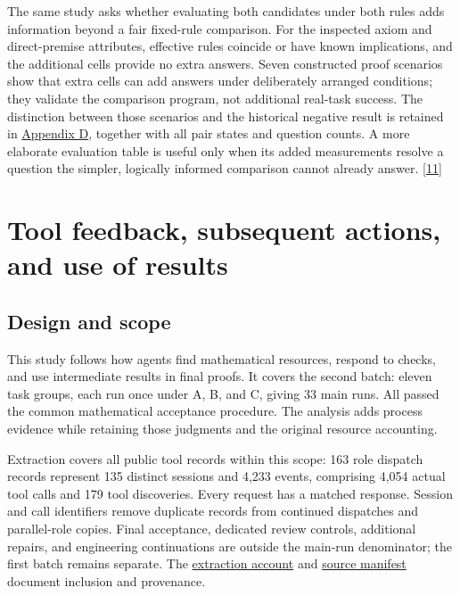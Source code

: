 The same study asks whether evaluating both candidates under both rules adds information beyond a fair fixed-rule comparison. For the inspected axiom and direct-premise attributes, effective rules coincide or have known implications, and the additional cells provide no extra answers. Seven constructed proof scenarios show that extra cells can add answers under deliberately arranged conditions; they validate the comparison program, not additional real-task success. The distinction between those scenarios and the historical negative result is retained in \href{en-appendix.pdf\#appendix-d}{Appendix D}, together with all pair states and question counts. A more elaborate evaluation table is useful only when its added measurements resolve a question the simpler, logically informed comparison cannot already answer. \href{en.pdf\#ref-11}{\mbox{[11]}}

\section[Tool feedback, subsequent actions, and use of results]{\texorpdfstring{\protect\hypertarget{appendix-s}{}Tool feedback, subsequent actions, and use of results}{Tool feedback, subsequent actions, and use of results}}
\subsection[Design and scope]{\texorpdfstring{\protect\hypertarget{s1}{}Design and scope}{Design and scope}}
This study follows how agents find mathematical resources, respond to checks, and use intermediate results in final proofs. It covers the second batch: eleven task groups, each run once under A, B, and C, giving 33 main runs. All passed the common mathematical acceptance procedure. The analysis adds process evidence while retaining those judgments and the original resource accounting.

Extraction covers all public tool records within this scope: 163 role dispatch records represent 135 distinct sessions and 4,233 events, comprising 4,054 actual tool calls and 179 tool discoveries. Every request has a matched response. Session and call identifiers remove duplicate records from continued dispatches and parallel-role copies. Final acceptance, dedicated review controls, additional repairs, and engineering continuations are outside the main-run denominator; the first batch remains separate. The \href{research/extraction/README.zh-CN.md}{extraction account} and \href{research/extraction/source_manifest.json}{source manifest} document inclusion and provenance.

